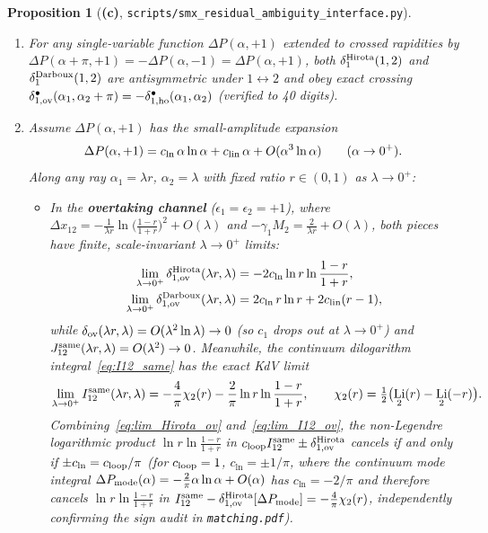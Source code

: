 \documentclass[11pt,a4paper]{article}
\newcommand{\Lc}{\textsf{\textbf{(c)}}}
\newcommand{\smxamb}{\texttt{scripts/\allowbreak smx\_\allowbreak residual\_\allowbreak ambiguity\_\allowbreak interface.py}}
\DeclareMathOperator{\Li}{Li}
\newtheorem{proposition}{Proposition}[section]
\theoremstyle{remark}
\begin{document}
\begin{proposition}[\Lc, \smxamb]\label{prop:small_amp_interface}
\begin{enumerate}
\item For \emph{any} single-variable function $\Delta P(\alpha,+1)$ extended to crossed rapidities by $\Delta P(\alpha+\pi,+1)=-\Delta P(\alpha,-1)=\Delta P(\alpha,+1)$, both $\delta_1^{\rm Hirota}(1,2)$ and $\delta_1^{\rm Darboux}(1,2)$ are antisymmetric under $1\leftrightarrow 2$ and obey exact crossing $\delta_{1,\rm ov}^{\bullet}(\alpha_1,\alpha_2+\pi)=-\delta_{1,\rm ho}^{\bullet}(\alpha_1,\alpha_2)$ (verified to 40 digits).
\item Assume $\Delta P(\alpha,+1)$ has the small-amplitude expansion
\begin{equation}\label{eq:DeltaP_small}
\Delta P(\alpha,+1)=c_{\ln}\,\alpha\ln\alpha+c_{\rm lin}\,\alpha+O(\alpha^3\ln\alpha)\qquad(\alpha\to 0^+).
\end{equation}
Along any ray $\alpha_1=\lambda r$, $\alpha_2=\lambda$ with fixed ratio $r\in(0,1)$ as $\lambda\to 0^+$:
\begin{itemize}
\item In the \textbf{overtaking channel} ($\epsilon_1=\epsilon_2=+1$), where $\Delta x_{12}=-\frac{1}{\lambda r}\ln\bigl(\frac{1-r}{1+r}\bigr)^2+O(\lambda)$ and $-\gamma_1 M_2=\frac{2}{\lambda r}+O(\lambda)$, both pieces have finite, scale-invariant $\lambda\to 0^+$ limits:
\begin{align}
\lim_{\lambda\to 0^+}\delta_{1,\rm ov}^{\rm Hirota}(\lambda r,\lambda)&=-2c_{\ln}\ln r\ln\frac{1-r}{1+r},\label{eq:lim_Hirota_ov}\\
\lim_{\lambda\to 0^+}\delta_{1,\rm ov}^{\rm Darboux}(\lambda r,\lambda)&=2c_{\ln}\,r\ln r+2c_{\rm lin}(r-1),\label{eq:lim_Darboux_ov}
\end{align}
while $\delta_{\rm ov}(\lambda r,\lambda)=O(\lambda^2\ln\lambda)\to 0$ (so $c_1$ drops out at $\lambda\to 0^+$) and $J_{12}^{\rm same}(\lambda r,\lambda)=O(\lambda^2)\to 0$. Meanwhile, the continuum dilogarithm integral~\eqref{eq:I12_same} has the exact KdV limit
\begin{equation}\label{eq:lim_I12_ov}
\lim_{\lambda\to 0^+}I_{12}^{\rm same}(\lambda r,\lambda)=-\frac{4}{\pi}\chi_2(r)-\frac{2}{\pi}\ln r\ln\frac{1-r}{1+r},\qquad
\chi_2(r)=\tfrac12\bigl(\Li_2(r)-\Li_2(-r)\bigr).
\end{equation}
Combining~\eqref{eq:lim_Hirota_ov} and~\eqref{eq:lim_I12_ov}, the non-Legendre logarithmic product $\ln r\ln\frac{1-r}{1+r}$ in $c_{\rm loop}I_{12}^{\rm same}\pm\delta_{1,\rm ov}^{\rm Hirota}$ cancels if and only if $\pm c_{\ln}=c_{\rm loop}/\pi$ (for $c_{\rm loop}=1$, $c_{\ln}=\pm 1/\pi$, where the continuum mode integral $\Delta P_{\rm mode}(\alpha)=-\frac2\pi\alpha\ln\alpha+O(\alpha)$ has $c_{\ln}=-2/\pi$ and therefore cancels $\ln r\ln\frac{1-r}{1+r}$ in $I_{12}^{\rm same}-\delta_{1,\rm ov}^{\rm Hirota}[\Delta P_{\rm mode}]=-\frac4\pi\chi_2(r)$, independently confirming the sign audit in \texttt{matching.pdf}).

\end{itemize}
\end{enumerate}
\end{proposition}
\end{document}
